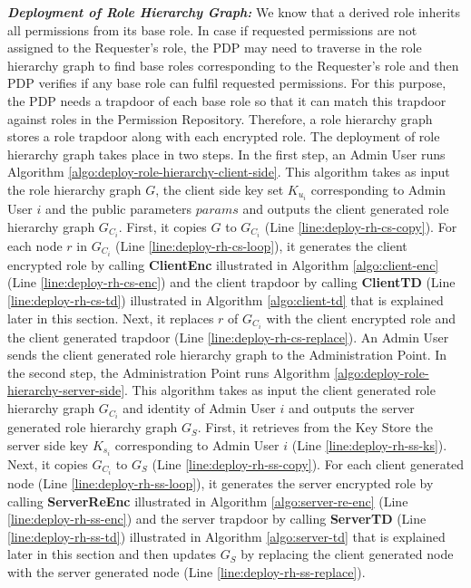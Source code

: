 \documentclass[final,5p,times,twocolumn]{elsarticle}
\begin{document}
\emph{\textbf{Deployment of Role Hierarchy Graph:}} 
We know that a derived role inherits all permissions from its base role. In case if requested permissions are not assigned to the Requester's role, the PDP may need to traverse in the role hierarchy graph to find base roles corresponding to the Requester's role and then PDP verifies if any base role can fulfil requested permissions. For this purpose, the PDP needs a trapdoor of each base role so that it can match this trapdoor against roles in the Permission Repository. Therefore, a role hierarchy graph stores a role trapdoor along with each encrypted role. The deployment of role hierarchy graph takes place in two steps. In the first step, an Admin User runs Algorithm \ref{algo:deploy-role-hierarchy-client-side}. This algorithm takes as input the role hierarchy graph $G$, the client side key set $K_{u_i}$ corresponding to Admin User $i$ and the public parameters $params$ and outputs the client generated role hierarchy graph $G_{C_i}$. First, it copies $G$ to $G_{C_i}$  (Line \ref{line:deploy-rh-cs-copy}). For each node $r$ in $G_{C_i}$ (Line \ref{line:deploy-rh-cs-loop}), it generates the client encrypted role by calling \textbf{ClientEnc} illustrated in Algorithm \ref{algo:client-enc} (Line \ref{line:deploy-rh-cs-enc}) and the client trapdoor by calling \textbf{ClientTD} (Line \ref{line:deploy-rh-cs-td}) illustrated in Algorithm \ref{algo:client-td} that is explained later in this section. Next, it replaces $r$ of $G_{C_i}$ with the client encrypted role and the client generated trapdoor (Line \ref{line:deploy-rh-cs-replace}). An Admin User sends the client generated role hierarchy graph to the Administration Point. 
In the second step, the Administration Point runs Algorithm \ref{algo:deploy-role-hierarchy-server-side}. This algorithm takes as input the client generated role hierarchy graph $G_{C_i}$ and identity of Admin User $i$ and outputs the server generated role hierarchy graph $G_{S}$. First, it retrieves from the Key Store the server side key $K_{s_i}$ corresponding to Admin User $i$ (Line \ref{line:deploy-rh-ss-ks}). Next, it copies $G_{C_i}$ to $G_{S}$ (Line \ref{line:deploy-rh-ss-copy}). For each client generated node (Line \ref{line:deploy-rh-ss-loop}), it generates the server encrypted role by calling \textbf{ServerReEnc} illustrated in Algorithm \ref{algo:server-re-enc} (Line \ref{line:deploy-rh-ss-enc}) and the server trapdoor by calling \textbf{ServerTD} (Line \ref{line:deploy-rh-ss-td}) illustrated in Algorithm \ref{algo:server-td} that is explained later in this section and then updates $G_{S}$ by replacing the client generated node with the server generated node (Line \ref{line:deploy-rh-ss-replace}). 
\end{document}

